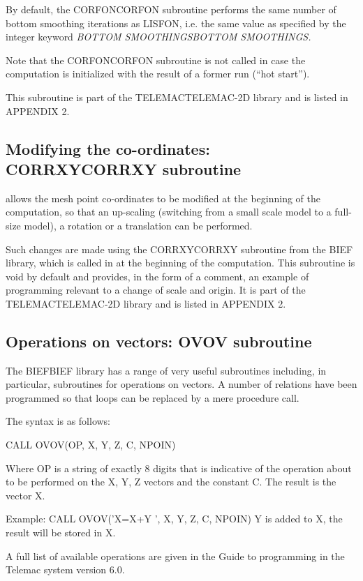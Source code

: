  By default, the CORFONCORFON subroutine performs the same number of bottom smoothing iterations as LISFON, i.e. the same value as specified by the integer keyword \textit{BOTTOM SMOOTHINGSBOTTOM SMOOTHINGS.}

 Note that the CORFONCORFON subroutine is not called in case the computation is initialized with the result of a former \tomawac run (``hot start'').

 This subroutine is part of the TELEMACTELEMAC-2D library and is listed in APPENDIX 2.


\subsection{ Modifying the co-ordinates: CORRXYCORRXY subroutine }

 \tomawac allows the mesh point co-ordinates to be modified at the beginning of the computation, so that an up-scaling (switching from a small scale model to a full-size model), a rotation or a translation can be performed.

 Such changes are made using the CORRXYCORRXY subroutine from the BIEF library, which is called in at the beginning of the computation. This subroutine is void by default and provides, in the form of a comment, an example of programming relevant to a change of scale and origin. It is part of the TELEMACTELEMAC-2D library and is listed in APPENDIX 2.


\subsection{ Operations on vectors: OVOV subroutine }

 The BIEFBIEF library has a range of very useful subroutines including, in particular, subroutines for operations on vectors. A number of relations have been programmed so that loops can be replaced by a mere procedure call.

 The syntax is as follows:

 CALL OVOV(OP, X, Y, Z, C, NPOIN)

 Where OP is a string of exactly 8 digits that is indicative of the operation about to be performed on the X, Y, Z vectors and the constant C. The result is the vector X.

 Example:  CALL OVOV('X=X+Y ', X, Y, Z, C, NPOIN)  Y is added to X, the result will be stored in X.



 A full list of available operations are given in the Guide to programming in the Telemac system version 6.0.

